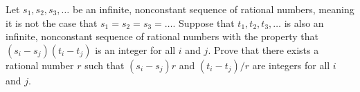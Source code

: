 Let $s_1, s_2, s_3, \dots$ be an infinite, nonconstant sequence of rational numbers, meaning it is not the case that $s_1 = s_2 = s_3 = \dots.$  Suppose that $t_1, t_2, t_3, \dots$ is also an infinite, nonconstant sequence of rational numbers with the property that $(s_i - s_j)(t_i - t_j)$ is an integer for all $i$ and $j$.  Prove that there exists a rational number $r$ such that $(s_i - s_j)r$ and $(t_i - t_j)/r$ are integers for all $i$ and $j$.